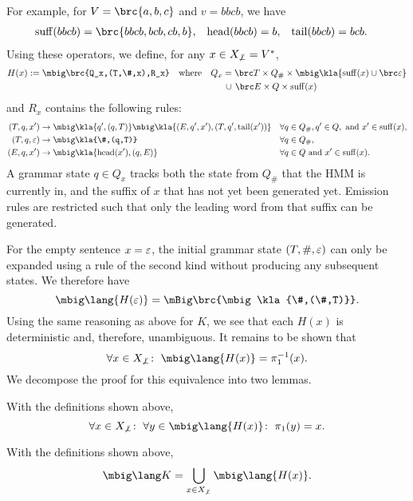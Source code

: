 For example, for $V = \brc{a,b,c}$ and $v = bbcb$, we have
\begin{align*}
 \suff(bbcb) &= \brc{bbcb, bcb, cb, b}, &
 \car(bbcb) &= b, &
 \cdr(bbcb) &= bcb.
\end{align*}
Using these operators, we define, for any $x\in X_{\not\bot} = V^*$,
\begin{align*}
 H(x) := \mbig\brc{Q_x,(T,\#,x),R_x} \quad\text{where}\quad
 Q_x &= \brc T \times Q_\# \times \mbig\kla{\suff(x)\cup\brc\eps} \\
 &\hspace{0.15em}\cup\hspace{0.15em} \brc E \times Q \times \suff(x)
\end{align*}
and $R_x$ contains the following rules:
\label{eq:03-R_x}\begin{align*}
 (T,q,x') &\to \mbig\kla{q',(q,T)}\mbig\kla{(E,q',x'),(T,q',\cdr(x'))} && \forall q\in Q_\#,q'\in Q,\text{ and }x'\in\suff(x), \\
 (T,q,\eps) &\to \mbig\kla{\#,(q,T)} && \forall q\in Q_\#, \\
 (E,q,x') &\to \mbig\kla{\car(x'),(q,E)} && \forall q\in Q\text{ and }x'\in\suff(x).
\end{align*}
%
A grammar state $q\in Q_x$ tracks both the state from $Q_\#$ that the HMM is
currently in, and the suffix of $x$ that has not yet been generated yet. Emission
rules are restricted such that only the leading word from that suffix can be generated.

For the empty sentence $x=\varepsilon$, the initial grammar state $(T,\#,\varepsilon)$ can
only be expanded using a rule of the second kind without producing any subsequent states.
We therefore have
\[
 \mbig\lang{H(\eps)} = \mBig\brc{\mbig\kla{\#,(\#,T)}}.
\]
%
Using the same reasoning as above for $K$, we see that each $H(x)$ is
deterministic and, therefore, unambiguous. It remains to be shown that
\[
 \forall x\in X_{\not\bot}\colon\;
 \mbig\lang{H(x)} = \pi_1^{-1}(x).
\]
We decompose the proof for this equivalence into two lemmas.

\begin{lemma}\label{lemma:03-consistent-yield}
 With the definitions shown above,
 \[
  \forall x\in X_{\not\bot}\colon\;
  \forall y\in \mbig\lang{H(x)}\colon\;
  \pi_1(y) = x.
 \]
\end{lemma}

\begin{lemma}\label{lemma:03-language-partition}
 With the definitions shown above,
 \[
  \mbig\lang K = \bigcup_{x\in X_{\not\bot}} \mbig\lang{H(x)}.
 \]
\end{lemma}

